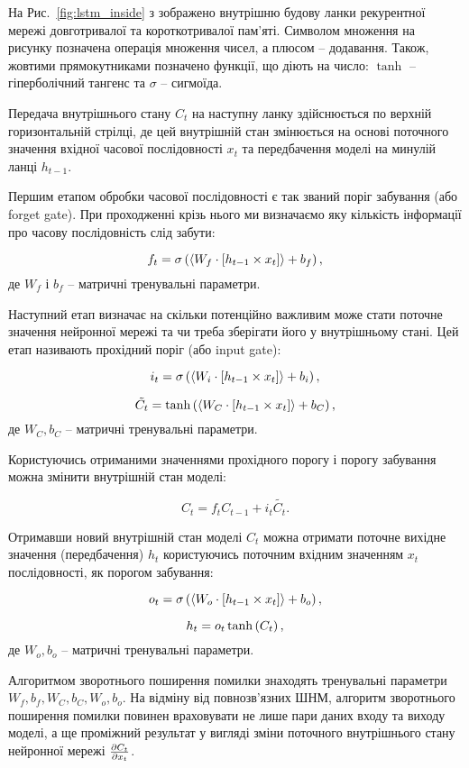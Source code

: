 На Рис.~\ref{fig:lstm_inside} з \cite{imp:Varsamopoulos2018} зображено 
внутрішню будову ланки рекурентної мережі довготривалої та короткотривалої 
пам'яті. Символом множення на рисунку позначена операція множення чисел, а 
плюсом -- додавання. Також, жовтими прямокутниками позначено функції, що діють 
на число: $ \tanh $ -- гіперболічний тангенс та $ \sigma $ -- сигмоїда.

Передача внутрішнього стану $ C_t $ на наступну ланку здійснюється по 
верхній горизонтальній стрілці, де цей внутрішній стан змінюється на основі
поточного значення вхідної часової послідовності $ x_t $ та передбачення 
моделі на минулій ланці $ h_{t-1} $.

Першим етапом обробки часової послідовності є так званий поріг забування
(або forget gate). При проходженні крізь нього ми визначаємо яку 
кількість інформації про часову послідовність слід забути:

\begin{equation}
f_t = \sigma \left( \left< W_f \cdot \left[ h_{t-1} \times x_t \right] \right> + b_f \right),
\end{equation}
%
де $ W_f $ і $ b_f $ -- матричні тренувальні параметри.

Наступний етап визначає на скільки потенційно важливим може стати поточне 
значення нейронної мережі та чи треба зберігати його у внутрішньому стані. 
Цей етап називають прохідний поріг (або input gate):

\begin{equation}
i_t = \sigma \left( \left< W_i \cdot \left[ h_{t-1} \times x_t \right] \right> + b_i \right),
\end{equation}

\begin{equation}
\tilde{C_t} = \tanh \left( \left< W_C \cdot \left[ h_{t-1} \times x_t \right] \right> + b_C \right),
\end{equation}
%
де $ W_C, b_C $ -- матричні тренувальні параметри.

Користуючись отриманими значеннями прохідного порогу і порогу забування
можна змінити внутрішній стан моделі:

\begin{equation}
C_t = f_t C_{t-1} + i_t \tilde{C_t}.
\end{equation}

Отримавши новий внутрішній стан моделі $ C_t $ можна отримати поточне вихідне 
значення (передбачення) $ h_t $ користуючись поточним вхідним значенням 
$ x_t $ послідовності, як порогом забування:

\begin{equation}
o_t = \sigma \left( \left< W_o \cdot \left[ h_{t-1} \times x_t \right] \right> + b_o \right),
\end{equation}

\begin{equation}
h_t = o_t \tanh \left( C_t \right),
\end{equation}
%
де $ W_o, b_o $ -- матричні тренувальні параметри.

Алгоритмом зворотнього поширення помилки знаходять тренувальні 
параметри $ W_f, b_f, W_C, b_C, W_o, b_o $. На відміну від повнозв'язних ШНМ, 
алгоритм зворотнього поширення помилки повинен враховувати не лише пари даних 
входу та виходу моделі, а ще проміжний результат у вигляді зміни поточного 
внутрішнього стану нейронної мережі $ \frac{\partial C_t}{\partial x_t} $.
